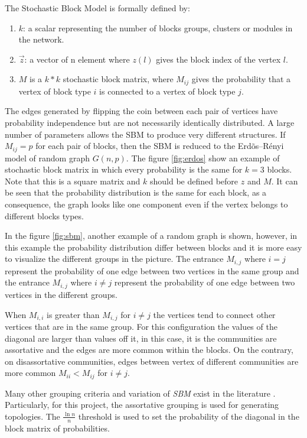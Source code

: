 The Stochastic Block Model is formally defined by: 
\begin{enumerate}

    \item $k$: a scalar representing the number of blocks groups, clusters or modules in the network.
    \item $\overrightarrow{z}$: a vector of n element where $z(l)$ gives the block index of the vertex $l$.
    \item $M$ is a $k * k$ stochastic block matrix, where $M_{ij}$ gives the probability that a vertex of block type $i$ is connected to a vertex of block type $j$.
\end{enumerate}


The edges generated by flipping the coin between each pair of vertices have probability independence but are not necessarily identically distributed. A large number of parameters allows the SBM  to produce very different structures. If $M_{ij} = p$ for each pair of blocks, then the SBM is reduced to the Erd\~os--R\'enyi model of random graph $G(n,p)$. The figure \ref{fig:erdos} show an example of stochastic block matrix in which every probability is the same for $k = 3$ blocks. Note that this is a square matrix and $k$ should be defined before $z$ and $M$. It can be seen that the probability distribution is the same for each block, as a consequence, the graph looks like one component even if the vertex belongs to different blocks types.

 In the figure \ref{fig:sbm}, another example of a random graph is shown, however, in this example the probability distribution differ between blocks and it is more easy to visualize the different groups in the picture. The entrance $M_{i,j}$ where $i = j$ represent the probability of one edge between two vertices in the same group and the entrance $M_{i,j}$ where $i \neq j$ represent the probability of one edge between two vertices in the different groups. 

When $M_{i,i}$ is greater than $M_{i,j}$ for $i \neq j$ the vertices tend to connect other vertices that are in the same group. For this configuration the values of the diagonal are larger than values off it, in this case, it is the communities are assortative and the edges are more common within the blocks. On the contrary, on disassortative communities, edges between vertex of different communities are more common $M_{ii} <  M_{ij}$ for $i \neq j$.


Many other grouping criteria and variation of \textit{SBM} exist in the literature \cite{carrington2005models,holland1983stochastic,airoldi2008mixed}. Particularly, for this project, the assortative grouping is used for generating topologies. The ${\tfrac {\ln n}{n}}$ threshold is used to set the probability of the diagonal in the block matrix of probabilities. 





